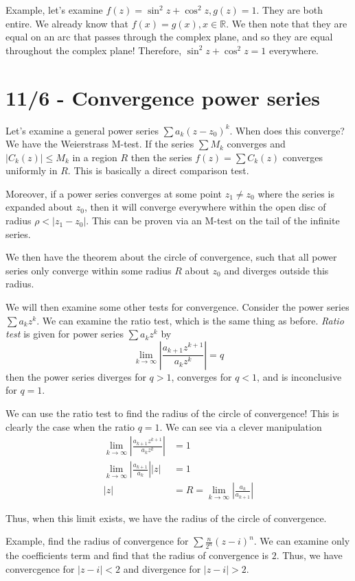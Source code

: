 \documentclass[10pt]{report}
\newcommand{\abs}[1]{\left|#1\right|}
\begin{document}
Example, let's examine $f(z) = \sin^2z + \cos^2z, g(z) = 1$. They are both entire. We already know that $f(x) = g(x), x \in \mathbb{R}$. We then note that they are equal on an arc that passes through the complex plane, and so they are equal throughout the complex plane! Therefore, $\sin^2 z + \cos^2 z = 1$ everywhere. 
\chapter{11/6 - Convergence power series}

Let's examine a general power series $\sum a_k(z-z_0)^k$. When does this converge? We have the Weierstrass M-test. If the series $\sum M_k$ converges and $\abs{C_k(z)} \leq M_k$ in a region $R$ then the series $f(z) = \sum C_k(z)$ converges uniformly in $R$. This is basically a direct comparison test.

Moreover, if a power series converges at some point $z_1 \neq z_0$ where the series is expanded about $z_0$, then it will converge everywhere within the open disc of radius $\rho < \abs{z_1 - z_0}$. This can be proven via an M-test on the tail of the infinite series.

We then have the theorem about the circle of convergence, such that all power series only converge within some radius $R$ about $z_0$ and diverges outside this radius.

We will then examine some other tests for convergence. Consider the power series $\sum a_kz^k$. We can examine the ratio test, which is the same thing as before. \emph{Ratio test} is given for power series $\sum a_kz^k$ by
$$\lim_{k \to \infty} \abs{\frac{a_{k+1}z^{k+1}}{a_kz^k}} = q$$
then the power series diverges for $q > 1$, converges for $q < 1$, and is inconclusive for $q = 1$.

We can use the ratio test to find the radius of the circle of convergence! This is clearly the case when the ratio $q = 1$. We can see via a clever manipulation
\begin{align*}
	\lim_{k \to \infty} \abs{\frac{a_{k+1}z^{k+1}}{a_kz^k}} &= 1\\
	\lim_{k \to \infty} \abs{\frac{a_{k+1}}{a_k}} \abs{z} &= 1\\
	\abs{z} &= R = \lim_{k \to \infty} \abs{\frac{a_k}{a_{k+1}}}
\end{align*}

Thus, when this limit exists, we have the radius of the circle of convergence.

Example, find the radius of convergence for $\sum \frac{n}{2^n}(z-i)^n$. We can examine only the coefficients term and find that the radius of convergence is $2$. Thus, we have convercgence for $\abs{z-i} < 2$ and divergence for $\abs{z-i} > 2$. 
\end{document}
